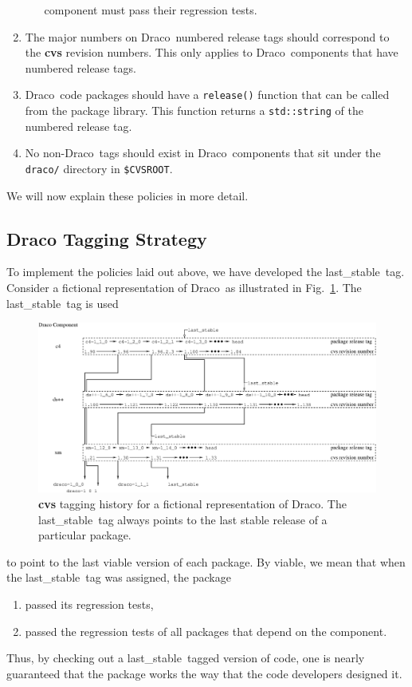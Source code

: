\documentclass[11pt]{nmemo}
\newcommand{\draco}{{\normalfont\normalsize\sffamily Draco}}
\newcommand{\stable}{{\normalfont\normalsize\ttfamily last\_stable}}
\begin{document}
\begin{enumerate}
\begin{itemize}
    component must pass their regression tests.
  \end{itemize}
\item The major numbers on \draco\ numbered release tags should
  correspond to the {\bf cvs} revision numbers.  This only applies to
  \draco\ components that have numbered release tags.
\item \draco\ code packages should have a \texttt{release()} function
  that can be called from the package library.  This function returns
  a \texttt{std::string} of the numbered release tag.
\item No non-\draco\ tags should exist in \draco\ components that sit
  under the \texttt{draco/} directory in \texttt{\$CVSROOT}.
\end{enumerate}
We will now explain these policies in more detail.

\subsection{Draco Tagging Strategy}
\label{sec:stable-tag}

To implement the policies laid out above, we have developed the
\stable\ tag.  Consider a fictional representation of \draco\ as
illustrated in Fig.~\ref{fig:tag-strategy}.  The \stable\ tag is used
\begin{figure}
  \centerline{\includegraphics[width=6.5in]{tag-strategy.eps}}
  \caption{{\bf cvs} tagging history for a fictional representation of 
    \draco.  The \stable\ tag always points to the last stable release 
    of a particular package.}
  \label{fig:tag-strategy}
\end{figure}
to point to the last viable version of each package.  By viable, we
mean that when the \stable\ tag was assigned, the package
\begin{enumerate}
\item passed its regression tests,
\item passed the regression tests of all packages that depend on the
  component.
\end{enumerate}
Thus, by checking out a \stable\ tagged version of code, one is
nearly guaranteed that the package works the way that the code
developers designed it.
\end{document}

